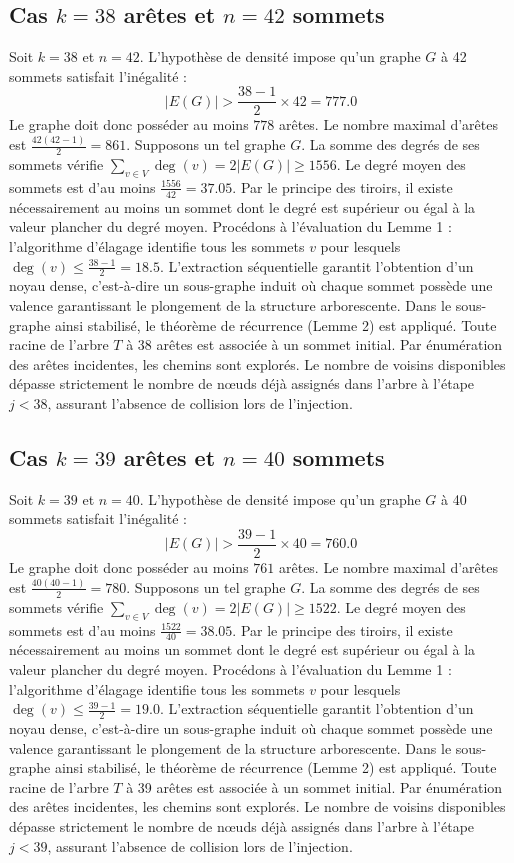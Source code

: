 \documentclass[12pt,a4paper]{article}
\begin{document}
\subsection{Cas $k = 38$ arêtes et $n = 42$ sommets}
Soit $k = 38$ et $n = 42$. L'hypothèse de densité impose qu'un graphe $G$ à 42 sommets satisfait l'inégalité :
$$ |E(G)| > \frac{38-1}{2} \times 42 = 777.0 $$
Le graphe doit donc posséder au moins $778$ arêtes. Le nombre maximal d'arêtes est $\frac{42(42-1)}{2} = 861$.
Supposons un tel graphe $G$. La somme des degrés de ses sommets vérifie $\sum_{v \in V} \deg(v) = 2|E(G)| \geq 1556$.
Le degré moyen des sommets est d'au moins $\frac{1556}{42} = 37.05$.
Par le principe des tiroirs, il existe nécessairement au moins un sommet dont le degré est supérieur ou égal à la valeur plancher du degré moyen.
Procédons à l'évaluation du Lemme 1 : l'algorithme d'élagage identifie tous les sommets $v$ pour lesquels $\deg(v) \leq \frac{38-1}{2} = 18.5$.
L'extraction séquentielle garantit l'obtention d'un noyau dense, c'est-à-dire un sous-graphe induit où chaque sommet possède une valence garantissant le plongement de la structure arborescente.
Dans le sous-graphe ainsi stabilisé, le théorème de récurrence (Lemme 2) est appliqué. Toute racine de l'arbre $T$ à 38 arêtes est associée à un sommet initial. Par énumération des arêtes incidentes, les chemins sont explorés. Le nombre de voisins disponibles dépasse strictement le nombre de nœuds déjà assignés dans l'arbre à l'étape $j < 38$, assurant l'absence de collision lors de l'injection.

\subsection{Cas $k = 39$ arêtes et $n = 40$ sommets}
Soit $k = 39$ et $n = 40$. L'hypothèse de densité impose qu'un graphe $G$ à 40 sommets satisfait l'inégalité :
$$ |E(G)| > \frac{39-1}{2} \times 40 = 760.0 $$
Le graphe doit donc posséder au moins $761$ arêtes. Le nombre maximal d'arêtes est $\frac{40(40-1)}{2} = 780$.
Supposons un tel graphe $G$. La somme des degrés de ses sommets vérifie $\sum_{v \in V} \deg(v) = 2|E(G)| \geq 1522$.
Le degré moyen des sommets est d'au moins $\frac{1522}{40} = 38.05$.
Par le principe des tiroirs, il existe nécessairement au moins un sommet dont le degré est supérieur ou égal à la valeur plancher du degré moyen.
Procédons à l'évaluation du Lemme 1 : l'algorithme d'élagage identifie tous les sommets $v$ pour lesquels $\deg(v) \leq \frac{39-1}{2} = 19.0$.
L'extraction séquentielle garantit l'obtention d'un noyau dense, c'est-à-dire un sous-graphe induit où chaque sommet possède une valence garantissant le plongement de la structure arborescente.
Dans le sous-graphe ainsi stabilisé, le théorème de récurrence (Lemme 2) est appliqué. Toute racine de l'arbre $T$ à 39 arêtes est associée à un sommet initial. Par énumération des arêtes incidentes, les chemins sont explorés. Le nombre de voisins disponibles dépasse strictement le nombre de nœuds déjà assignés dans l'arbre à l'étape $j < 39$, assurant l'absence de collision lors de l'injection.
\end{document}
